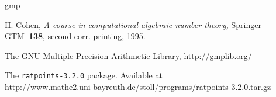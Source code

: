 \documentclass[12pt,a4paper,oneside]{amsart}
\newcommand{\rpversion}{3.2.0} %
\begin{document}
\begin{thebibliography}{gmp}
\frenchspacing

  H. Cohen, \textit{A course in computational algebraic number theory,}
  Springer GTM~\textbf{138}, second corr. printing, 1995.

  The GNU Multiple Precision Arithmetic Library, \url{http://gmplib.org/}

  The \texttt{ratpoints-\rpversion} package. Available at \\
  \url{http://www.mathe2.uni-bayreuth.de/stoll/programs/ratpoints-\rpversion.tar.gz}

\end{thebibliography}
\end{document}
